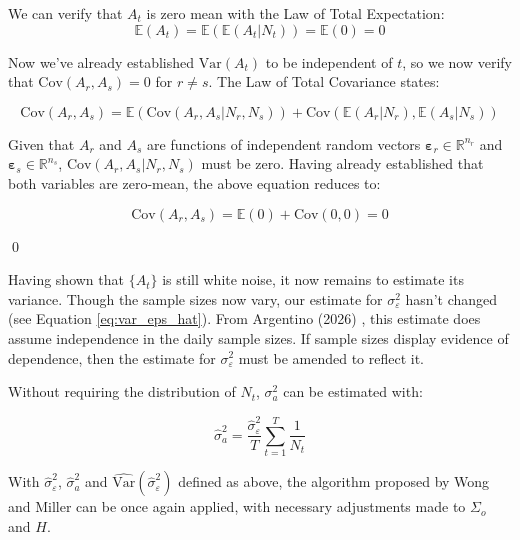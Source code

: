 We can verify that $A_t$ is zero mean with the Law of Total Expectation:
$$ \mathbb{E}(A_t) = \mathbb{E}(\mathbb{E}(A_t|N_t)) = \mathbb{E}(0) = 0 $$

Now we've already established $\text{Var}(A_t)$ to be independent of $t$, so we now 
verify that $\text{Cov}(A_r,A_s) = 0$ for $r \neq s$. The Law of Total Covariance states:


$$ \text{Cov}(A_r,A_s) = \mathbb{E}(\text{Cov}(A_r,A_s|N_r,N_s)) + \text{Cov}(\mathbb{E}(A_r|N_r), \mathbb{E}(A_s|N_s))$$

Given that $A_r$ and $A_s$ are functions of independent random vectors $\bm{\varepsilon}_r \in \mathbb{R}^{n_r}$ and $\bm{\varepsilon}_s \in \mathbb{R}^{n_s}$, $\text{Cov}(A_r,A_s|N_r,N_s)$ must be zero. Having already established that both variables are zero-mean, the above equation reduces to:

$$ \text{Cov}(A_r,A_s) = \mathbb{E}(0) + \text{Cov}(0, 0) = 0$$

\qed

Having shown that $\{A_t\}$ is still white noise, it now remains to estimate its variance. 
Though the sample sizes now vary, our estimate for $\sigma_\varepsilon^2$ hasn't changed (see Equation \ref{eq:var_eps_hat}).
From Argentino (2026) \cite{Argentino2026}, this estimate does assume independence in the
daily sample sizes. If sample sizes display evidence of dependence, then the estimate for
$\sigma_\varepsilon^2$ must be amended to reflect it.




Without requiring the distribution of $N_t$, $\sigma_a^2$ can be estimated with:

\begin{equation}
    \label{eq:var_a_n}
    \hat{\sigma}_a^2 = \frac{\hat{\sigma}_\varepsilon^2}{T}\sum_{t=1}^T\frac{1}{N_t}
\end{equation}

With $\hat{\sigma}_\varepsilon^2$, $\hat{\sigma}_a^2$ and $\hat{\text{Var}}(\hat{\sigma}_\varepsilon^2)$ defined as above, the algorithm proposed by Wong and Miller can be once again applied, with necessary adjustments made to $\Sigma_o$ and $H$. 










